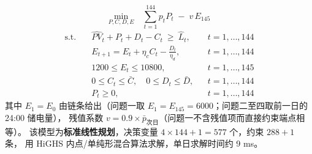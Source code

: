 \begin{equation}
\underset{P,C,D,E}{\text{min}}\quad \sum_{t=1}^{144} p_t P_t \;-\; v\,E_{145}
\label{eq:obj}
\end{equation}
\begin{align}
\text{s.t.}\quad & \hat{PV}_t + P_t + D_t - C_t \ \ge\ \hat L_t, && t=1,\dots,144 \label{eq:c1}\\
& E_{t+1} = E_t + \eta_c C_t - \frac{D_t}{\eta_d}, && t=1,\dots,144 \label{eq:c2}\\
& 1200 \le E_t \le 10800, && t=1,\dots,145 \label{eq:c3}\\
& 0 \le C_t \le \bar C,\quad 0 \le D_t \le \bar D, && t=1,\dots,144 \label{eq:c4}\\
& P_t \ge 0, && t=1,\dots,144 \label{eq:c5}
\end{align}
其中 $E_1=E_0$ 由链条给出（问题一取 $E_1=E_{145}=6000$\nobreak；问题二至四取前一日的 24:00 储电量\nobreak）\nobreak，
残值系数 $v=0.9\times\bar p_{\text{次日}}$（问题一不含残值项而直接约束端点相等\nobreak）\nobreak。
该模型为\textbf{标准线性规划}\nobreak，决策变量 $4\times144+1=577$ 个\nobreak，约束 $288+1$ 条\nobreak，
用 HiGHS 内点/单纯形混合算法求解\nobreak，单日求解时间约 9 ms\nobreak。
